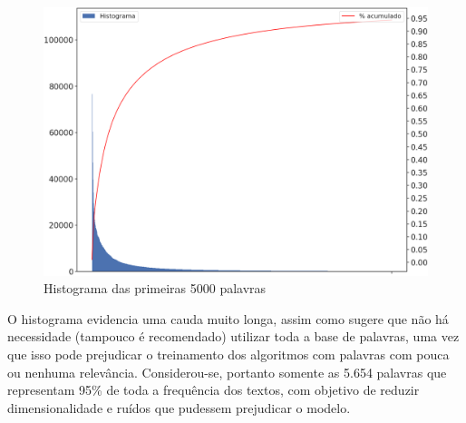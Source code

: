 \documentclass[twocolumn]{rbef}
\newcommand{\1}{\mathbbm{1}}
\begin{document}
\begin{figure}[!htb]
  \includegraphics[scale=0.23]{5. Histograma das 5000 primeiras palavras.png}
  \caption{Histograma das primeiras 5000 palavras}
  \label{fig5}
\end{figure}
\newline\linebreak O histograma evidencia uma cauda muito longa, assim como sugere que não há necessidade (tampouco é recomendado) utilizar toda a base de palavras, uma vez que isso pode prejudicar o treinamento dos algoritmos com palavras com pouca ou nenhuma relevância. Considerou-se, portanto somente as 5.654 palavras que representam 95\% de toda a frequência dos textos, com objetivo de reduzir dimensionalidade e ruídos que pudessem prejudicar o modelo.
\end{document}
